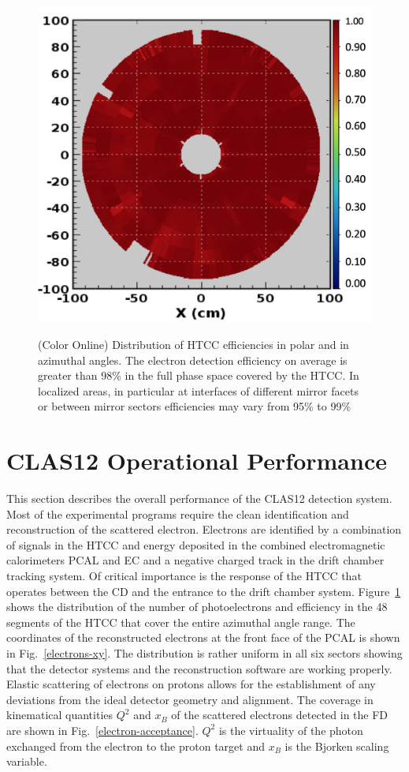 \documentclass[final,3p,twocolumn]{elsarticle}
\begin{document}
\begin{figure}[t!]
{\includegraphics[width=0.96\columnwidth]{htcc-eff.png}}
\caption{(Color Online) Distribution of HTCC efficiencies in polar and in azimuthal
angles. The electron detection efficiency on average is greater than 98\% in the full phase space covered by the HTCC.
In localized areas, in particular at interfaces of different mirror facets or between mirror sectors efficiencies may vary from 95\% to 99\% } 
\label{htcc-eff}
\end{figure}

\section{CLAS12 Operational Performance}

This section describes the overall performance of the CLAS12 detection system. Most of the experimental programs
require the clean identification and reconstruction of the scattered electron. Electrons are identified by a combination
of signals in the HTCC and energy deposited in the combined electromagnetic calorimeters PCAL and EC and a negative
charged track in the drift chamber tracking system. Of critical importance is the response of the HTCC that operates
between the CD and the entrance to the drift chamber system. Figure~\ref{htcc-eff} shows the distribution of the
number of photoelectrons and efficiency in the 48 segments of the HTCC that cover the entire azimuthal angle range. 
The coordinates of the reconstructed electrons at the front face of the PCAL is shown in Fig.~\ref{electrons-xy}. The
distribution is rather uniform in all six sectors showing that the detector systems and the reconstruction software are
working properly. Elastic scattering  of electrons on protons allows for the establishment of any deviations from the ideal
detector geometry and alignment. The coverage in kinematical quantities $Q^2$ and $x_B$ of the scattered electrons
detected in the FD are shown in Fig.~\ref{electron-acceptance}. $Q^2$ is the virtuality of the photon exchanged from
the electron to the proton target and $x_B$ is the Bjorken scaling variable.
\end{document}

